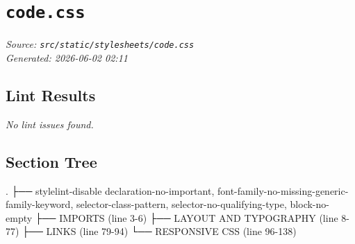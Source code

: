 
\section{\texttt{code.css}}
\textit{Source: \texttt{src/static/stylesheets/code.css}} \\
\textit{Generated: 2026-06-02 02:11} \\

\subsection{Lint Results}
\textit{No lint issues found.} \\

\subsection{Section Tree}
\begingroup
\linespread{0.9}\selectfont
\begin{verbnobox}[\FiraCode]
.
├── stylelint-disable declaration-no-important, font-family-no-missing-generic-family-keyword, selector-class-pattern, selector-no-qualifying-type, block-no-empty
├── IMPORTS  (line 3-6)
├── LAYOUT AND TYPOGRAPHY  (line 8-77)
├── LINKS  (line 79-94)
└── RESPONSIVE CSS  (line 96-138)
\end{verbnobox}
\endgroup
